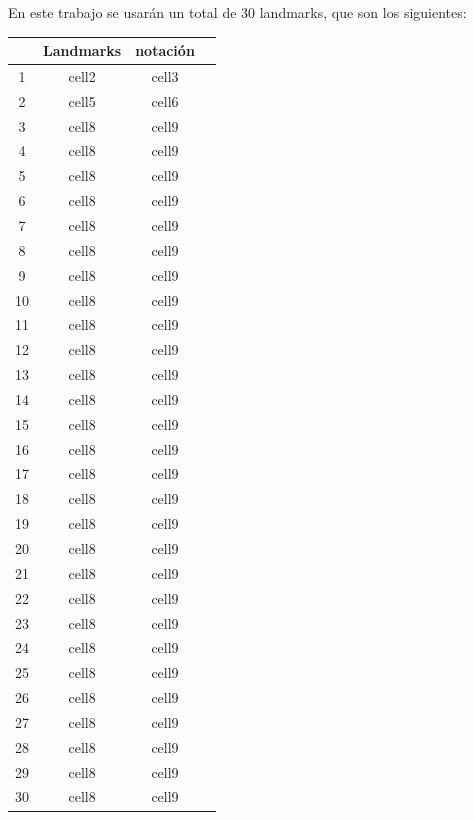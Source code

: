\medskip 

\noindent En este trabajo se usarán un total de $30$ landmarks, que son los siguientes: 

\begin{center}
    \begin{tabular}{ |c|c|c|c| } 
        \hline
         & \textbf{Landmarks} & \textbf{notación} \\
        \hline
        1 & cell2 & cell3 \\ 
        2 & cell5 & cell6 \\ 
        3 & cell8 & cell9 \\ 
        4 & cell8 & cell9 \\ 
        5 & cell8 & cell9 \\ 
        6 & cell8 & cell9 \\ 
        7 & cell8 & cell9 \\ 
        8 & cell8 & cell9 \\ 
        9 & cell8 & cell9 \\ 
        10 & cell8 & cell9 \\ 
        11 & cell8 & cell9 \\ 
        12 & cell8 & cell9 \\ 
        13 & cell8 & cell9 \\ 
        14 & cell8 & cell9 \\ 
        15 & cell8 & cell9 \\ 
        16 & cell8 & cell9 \\ 
        17 & cell8 & cell9 \\ 
        18 & cell8 & cell9 \\ 
        19 & cell8 & cell9 \\ 
        20 & cell8 & cell9 \\ 
        21 & cell8 & cell9 \\ 
        22 & cell8 & cell9 \\ 
        23 & cell8 & cell9 \\ 
        24 & cell8 & cell9 \\ 
        25 & cell8 & cell9 \\ 
        26 & cell8 & cell9 \\ 
        27 & cell8 & cell9 \\ 
        28 & cell8 & cell9 \\ 
        29 & cell8 & cell9 \\ 
        30 & cell8 & cell9 \\ 
        \hline
    \end{tabular}
\end{center}

